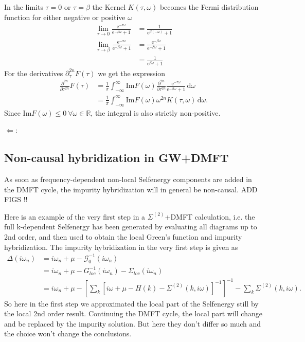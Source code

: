 \documentclass[12pt,a4paper]{scrartcl}
\numberwithin{equation}{section}
\begin{document}
In the limits $\tau=0$ or $\tau = \beta$ the Kernel $K(\tau,\omega)$ becomes the Fermi
distribution function for either negative or positive $\omega$
\begin{align}
 \lim\limits_{\tau\rightarrow 0}
 \frac{\mathrm{e}^{-\tau\omega}}{\mathrm{e}^{-\beta\omega}+1} 
 &=  \frac{1}{\mathrm{e}^{\beta(-\omega)}+1} \\
  \lim\limits_{\tau\rightarrow \beta}
 \frac{\mathrm{e}^{-\tau\omega}}{\mathrm{e}^{-\beta\omega}+1} 
 &= \frac{\mathrm{e}^{-\beta\omega}}{\mathrm{e}^{-\beta\omega}+1} \\
 &= \frac{1}{\mathrm{e}^{\beta\omega}+1}
\end{align}
For the derivatives $\partial_{\tau}^{2n} F(\tau) $ 
we get the expression
\begin{align}
\frac{\partial^{2n} }{\partial \tau^{2n}} F(\tau)
&=\frac{1}{\pi} \int_{-\infty}^{\infty} \mathrm{Im}F(\omega) 
 \frac{\partial^{2n} }{\partial \tau^{2n}}
          \frac{\mathrm{e}^{-\tau\omega}}{\mathrm{e}^{-\beta\omega}+1} \, \mathrm{d}\omega   \\
%             
&= \frac{1}{\pi} \int_{-\infty}^{\infty} \mathrm{Im}F(\omega) 
\omega^{2n}   K(\tau,\omega) \, \mathrm{d}\omega.
\end{align}
Since $\mathrm{Im}F(\omega) \leq 0 \  \forall \omega \in \mathbb{R}$,
the integral is also strictly non-positive.

\bigskip

$\Leftarrow$:




\subsection{Non-causal hybridization in GW+DMFT}
As soon as frequency-dependent non-local Selfenergy components are
added in the DMFT cycle, the impurity hybridization will in general
be non-causal. ADD FIGS !!

Here is an example of the very first step in a $\Sigma^{(2)}$+DMFT calculation, i.e.
the full k-dependent Selfenergy has been generated by evaluating all diagrams up to 2nd order,
and then used to obtain the local Green's function and impurity hybridization.
The impurity hybridization in the very first step is given as
\begin{align}
 \Delta(i\omega_n)
 &= i\omega_n + \mu - \mathcal{G}_0^{-1}(i\omega_n) \\
 &= i\omega_n + \mu - G_{loc}^{-1}(i\omega_n) - \Sigma_{loc}(i\omega_n) \\
 &= i\omega_n + \mu - \left[\sum_k [i\omega+\mu-H(k)-\Sigma^{(2)}(k,i\omega)]^{-1} \right]^{-1} -\sum_k \Sigma^{(2)}(k,i\omega) .
\end{align}
So here in the first step we approximated the local part of the Selfenergy still by the local 2nd order
result. Continuing the DMFT cycle, the local part will change and be replaced by the impurity solution.
But here they don't differ so much and the choice won't change the conclusions.
\end{document}
